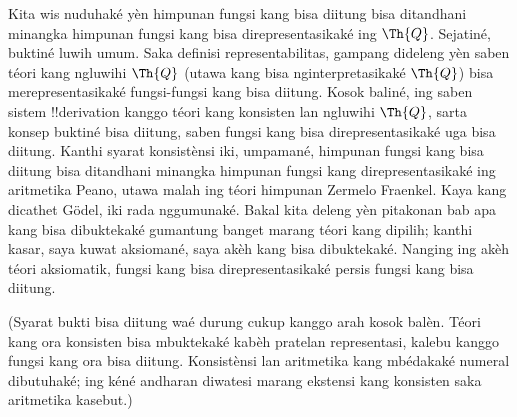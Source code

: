 \documentclass[../../../include/open-logic-section]{subfiles}
\begin{document}
\begin{explain}
Kita wis nuduhaké yèn himpunan fungsi kang bisa diitung bisa
ditandhani minangka himpunan fungsi kang bisa direpresentasikaké
ing $\Th{Q}$. Sejatiné, buktiné luwih umum.
Saka definisi representabilitas, gampang dideleng yèn
saben téori kang ngluwihi $\Th{Q}$ (utawa kang bisa
nginterpretasikaké $\Th{Q}$) bisa merepresentasikaké
fungsi-fungsi kang bisa diitung. Kosok baliné, ing saben
sistem !!{derivation} kanggo téori kang konsisten lan ngluwihi
$\Th{Q}$, sarta konsep buktiné bisa diitung,
saben fungsi kang bisa direpresentasikaké uga bisa diitung.
Kanthi syarat konsistènsi iki, umpamané, himpunan fungsi kang bisa diitung bisa
ditandhani minangka himpunan fungsi kang direpresentasikaké
ing aritmetika Peano, utawa malah ing téori himpunan Zermelo
Fraenkel. Kaya kang dicathet G\"odel, iki rada nggumunaké.
Bakal kita deleng yèn pitakonan bab apa kang bisa dibuktekaké
gumantung banget marang téori kang dipilih; kanthi kasar,
saya kuwat aksiomané, saya akèh kang bisa dibuktekaké.
Nanging ing akèh téori aksiomatik, fungsi kang bisa
direpresentasikaké persis fungsi kang bisa diitung.
\end{explain}
(Syarat bukti bisa diitung waé durung cukup kanggo arah kosok balèn. Téori kang ora konsisten bisa mbuktekaké kabèh pratelan representasi, kalebu kanggo fungsi kang ora bisa diitung. Konsistènsi lan aritmetika kang mbédakaké numeral dibutuhaké; ing kéné andharan diwatesi marang ekstensi kang konsisten saka aritmetika kasebut.)
\end{document}
